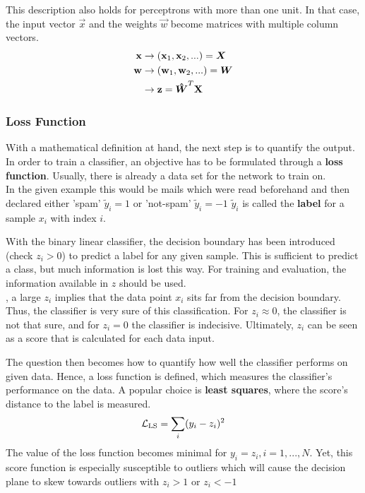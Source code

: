 This description also holds for perceptrons with more than one unit.
In that case, the input vector $\vec{x}$ and the weights $\vec{w}$ become matrices with multiple column vectors.
\begin{align}
    \mathbf{x} & \rightarrow (\mathbf{x}_1, \mathbf{x}_2, ...) = \boldsymbol{X} \\
    \mathbf{w} & \rightarrow (\mathbf{w}_1, \mathbf{w}_2, ...) = \boldsymbol{W} \\
    & \rightarrow \mathbf{z} = \boldsymbol{\hat{W}}^T \mathbf{X} \\
\end{align}


\subsubsection{Loss Function}
With a mathematical definition at hand, the next step is to quantify the output.
In order to train a classifier, an objective has to be formulated through a \textbf{loss function}.
Usually, there is already a data set for the network to train on.\\
In the given example this would be mails which were read beforehand and then declared either 'spam' $\tilde{y}_i = 1$ or 'not-spam' $\tilde{y}_i = -1$
$\tilde{y}_i$ is called the \textbf{label} for a sample $x_i$ with index $i$.

With the binary linear classifier, the decision boundary has been introduced (check $z_i > 0$) to predict a label for any given sample.
This is sufficient to predict a class, but much information is lost this way.
For training and evaluation, the information available in $z$ should be used.\\
\eg, a large $z_i$ implies that the data point $x_i$ sits far from the decision boundary.
Thus, the classifier is very sure of this classification.
For $z_i \approx 0$, the classifier is not that sure, and for $z_i = 0$ the classifier is indecisive.
Ultimately, $z_i$ can be seen as a score that is calculated for each data input.

The question then becomes how to quantify how well the classifier performs on given data.
Hence, a loss function is defined, which measures the classifier's performance on the data.
A popular choice is \textbf{least squares}, where the score's distance to the label is measured.
\begin{align}
    \mathcal{L}_{\text{LS}} = \sum_i (y_i - z_i)^2
\end{align}
The value of the loss function becomes minimal for $y_i = z_i, i = 1,...,N$.
Yet, this score function is especially susceptible to outliers which will cause the decision plane to skew towards outliers with $z_i > 1$ or $z_i < -1$

